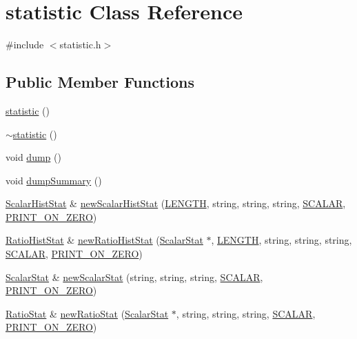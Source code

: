 \hypertarget{classstatistic}{
\section{statistic Class Reference}
\label{classstatistic}
}


{\ttfamily \#include $<$statistic.h$>$}

\subsection*{Public Member Functions}
\begin{DoxyCompactItemize}
\item 
\hyperlink{classstatistic_a3f28cad0a4699e3f2db3892b5556f4e7}{statistic} ()
\item 
\hyperlink{classstatistic_a9edcb4dd9cdc09bdfe9a61d2f95654ca}{$\sim$statistic} ()
\item 
void \hyperlink{classstatistic_a75175df2e04fd107046dd6a9aa5356dd}{dump} ()
\item 
void \hyperlink{classstatistic_afa68a63b6c5511103123e9837a96c7ff}{dumpSummary} ()
\item 
\hyperlink{classScalarHistStat}{ScalarHistStat} \& \hyperlink{classstatistic_ad4d85ebb5f4446c66911f0c141e11f1a}{newScalarHistStat} (\hyperlink{binaryTranslator_2global_8h_a9f35cc405c37836572563f16d0302ba6}{LENGTH}, string, string, string, \hyperlink{global_2global_8h_a72e6b2d6dce7827a0bbf126287d2035a}{SCALAR}, \hyperlink{statistic_8h_a007ca0df4ad593f8771581e5b51584f4}{PRINT\_\-ON\_\-ZERO})
\item 
\hyperlink{classRatioHistStat}{RatioHistStat} \& \hyperlink{classstatistic_ae549d19ee6776db84c3c7d7e2145d92a}{newRatioHistStat} (\hyperlink{classScalarStat}{ScalarStat} $\ast$, \hyperlink{binaryTranslator_2global_8h_a9f35cc405c37836572563f16d0302ba6}{LENGTH}, string, string, string, \hyperlink{global_2global_8h_a72e6b2d6dce7827a0bbf126287d2035a}{SCALAR}, \hyperlink{statistic_8h_a007ca0df4ad593f8771581e5b51584f4}{PRINT\_\-ON\_\-ZERO})
\item 
\hyperlink{classScalarStat}{ScalarStat} \& \hyperlink{classstatistic_afc9d7ba7128d7c3b7a70105fb829ab4f}{newScalarStat} (string, string, string, \hyperlink{global_2global_8h_a72e6b2d6dce7827a0bbf126287d2035a}{SCALAR}, \hyperlink{statistic_8h_a007ca0df4ad593f8771581e5b51584f4}{PRINT\_\-ON\_\-ZERO})
\item 
\hyperlink{classRatioStat}{RatioStat} \& \hyperlink{classstatistic_a3cbaef36cc0ea9a2f7a400e01ce8aa6e}{newRatioStat} (\hyperlink{classScalarStat}{ScalarStat} $\ast$, string, string, string, \hyperlink{global_2global_8h_a72e6b2d6dce7827a0bbf126287d2035a}{SCALAR}, \hyperlink{statistic_8h_a007ca0df4ad593f8771581e5b51584f4}{PRINT\_\-ON\_\-ZERO})

\end{DoxyCompactItemize}
